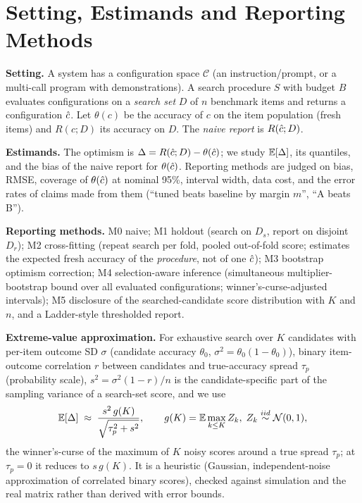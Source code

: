 \section{Setting, Estimands and Reporting Methods}
\label{sec:method}
\textbf{Setting.} A system has a configuration space $\mathcal C$ (an instruction/prompt, or a multi-call program with demonstrations). A search procedure $S$ with budget $B$ evaluates configurations on a \emph{search set} $D$ of $n$ benchmark items and returns a configuration $\hat c$. Let $\theta(c)$ be the accuracy of $c$ on the item population (fresh items) and $R(c;D)$ its accuracy on $D$. The \emph{naive report} is $R(\hat c;D)$.

\textbf{Estimands.} The optimism is $\Delta=R(\hat c;D)-\theta(\hat c)$; we study $\mathbb{E}[\Delta]$, its quantiles, and the bias of the naive report for $\theta(\hat c)$. Reporting methods are judged on bias, RMSE, coverage of $\theta(\hat c)$ at nominal 95\%, interval width, data cost, and the error rates of claims made from them (``tuned beats baseline by margin $m$'', ``A beats B'').

\textbf{Reporting methods.} M0 naive; M1 holdout (search on $D_s$, report on disjoint $D_r$); M2 cross-fitting (repeat search per fold, pooled out-of-fold score; estimates the expected fresh accuracy of the \emph{procedure}, not of one $\hat c$); M3 bootstrap optimism correction; M4 selection-aware inference (simultaneous multiplier-bootstrap bound over all evaluated configurations; winner's-curse-adjusted intervals); M5 disclosure of the searched-candidate score distribution with $K$ and $n$, and a Ladder-style thresholded report.

\textbf{Extreme-value approximation.} For exhaustive search over $K$ candidates with per-item outcome SD $\sigma$ (candidate accuracy $\theta_0$, $\sigma^2=\theta_0(1-\theta_0)$), binary item-outcome correlation $r$ between candidates and true-accuracy spread $\tau_p$ (probability scale), $s^2=\sigma^2(1-r)/n$ is the candidate-specific part of the sampling variance of a search-set score, and we use
\begin{equation}
\mathbb{E}[\Delta]\;\approx\;\frac{s^2\,g(K)}{\sqrt{\tau_p^2+s^2}},\qquad g(K)=\mathbb{E}\max_{k\le K}Z_k,\; Z_k\stackrel{iid}{\sim}\mathcal N(0,1),
\end{equation}
the winner's-curse of the maximum of $K$ noisy scores around a true spread $\tau_p$; at $\tau_p=0$ it reduces to $s\,g(K)$. It is a heuristic (Gaussian, independent-noise approximation of correlated binary scores), checked against simulation and the real matrix rather than derived with error bounds.
